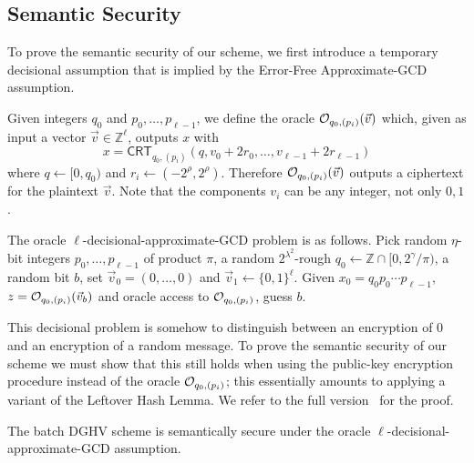 \documentclass{llncs}
\newcommand{\Z}{{\mathbb Z}}
\newcommand*{\crt}{\ensuremath{\mathsf{CRT}}}
\begin{document}
\subsection{Semantic Security}\label{sec:semantic-security}

To prove the semantic security of our scheme, 
we first introduce a temporary decisional assumption that is implied by the 
Error-Free Approximate-GCD assumption. 

Given integers $q_0$ and $p_0,\ldots,p_{\ell-1}$, we define the oracle
${\cal O}_{q_0,(p_i)}(\vec{v})$ which, given as input a vector $\vec{v} \in {\mathbb
  Z}^\ell$, outputs $x$ with
$$ x = \crt_{q_0,(p_i)}(q,v_0+2r_0,\ldots,v_{\ell-1}+2r_{\ell-1})$$
where $q \leftarrow [0,q_0)$ and $r_i \leftarrow
    (-2^\rho,2^\rho)$. Therefore ${\cal O}_{q_0,(p_i)}(\vec{v})$
    outputs a ciphertext for the plaintext $\vec{v}$. Note that the
    components $v_i$ can be any integer, not only $0,1$.

\begin{definition} The
  oracle $\ell$-decisional-approximate-GCD problem is as
  follows. Pick random $\eta$-bit 
  integers $p_0,\ldots,p_{\ell-1}$ of product $\pi$, a random
  $2^{\lambda^2}$-rough $q_0 \leftarrow \Z \cap  
  [0,2^{\gamma}/\pi)$, a random bit $b$, set $\vec{v}_0=
  (0,\ldots,0)$
and $\vec{v}_1\leftarrow
  \{0,1\}^\ell$. Given  $x_0=q_0p_0\cdots p_{\ell-1}$, $z={\cal O}_{q_0,(p_i)}(\vec{v}_b)$ and oracle access to ${\cal
    O}_{q_0,(p_i)}$, guess $b$.
\end{definition}
 
This decisional
problem is somehow to distinguish between an encryption of $0$ and
an encryption of a random message. To prove the semantic security 
of our scheme we must show that this  still holds when using the public-key
encryption procedure instead of the oracle ${\cal 
    O}_{q_0,(p_i)}$; this essentially amounts to applying a variant
                    of the Leftover Hash Lemma. We refer to the full
                    version~\cite{CLT2013a} for the proof.

\begin{theorem}\label{thm:l-dAGC}
The batch DGHV scheme is semantically secure under the
oracle $\ell$-decisional-approximate-GCD assumption.
\end{theorem}
\end{document}
